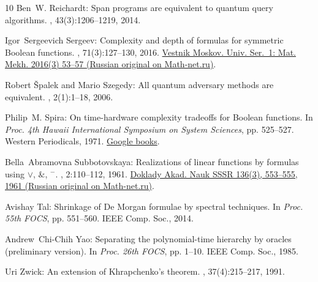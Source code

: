 \begin{thebibliography}{10}
{\sc Ben~W. Reichardt}: Span programs are equivalent to quantum query
  algorithms.
, 43(3):1206--1219, 2014.
\newblock [\epfmtdoi{10.1137/100792640}]

{\sc Igor~Sergeevich Sergeev}: Complexity and depth of formulas for symmetric
  {B}oolean functions.
, 71(3):127--130, 2016.
\newblock \href{https://mi.mathnet.ru/vmumm155}{Vestnik Moskov. Univ. Ser.~1:
  Mat. Mekh. 2016(3) 53--57 (Russian original on Math-net.ru)}.
\newblock [\epfmtdoi{10.3103/S0027132216030098}]

{\sc Robert {\v{S}}palek and Mario Szegedy}: All quantum adversary methods are
  equivalent.
, 2(1):1--18, 2006.

{\sc Philip~M. Spira}: On time-hardware complexity tradeoffs for {B}oolean
  functions.
\newblock In {\em Proc. 4th Hawaii International Symposium on System Sciences},
  pp. 525--527. Western Periodicals, 1971.
\newblock
  \href{https://books.google.com/books/about/Proceedings_Fourth_Hawaii_International.html?id=Y0zVjwEACAAJ}{Google
  books}.

{\sc Bella~Abramovna Subbotovskaya}: Realizations of linear functions by
  formulas using $\vee$, $\&$, $^-$.
, 2:110--112, 1961.
\newblock \href{https://mi.mathnet.ru/dan24539}{Doklady Akad. Nauk SSSR 136(3),
  553--555, 1961 (Russian original on Math-net.ru)}.

{\sc Avishay Tal}: Shrinkage of {D}e {M}organ formulae by spectral techniques.
\newblock In {\em Proc. 55th FOCS}, pp. 551--560. IEEE Comp. Soc., 2014.

{\sc Andrew~Chi{-}Chih Yao}: Separating the polynomial-time hierarchy by
  oracles (preliminary version).
\newblock In {\em Proc. 26th FOCS}, pp. 1--10. IEEE Comp. Soc., 1985.

{\sc Uri Zwick}: An extension of {Khrapchenko}'s theorem.
, 37(4):215--217, 1991.
\newblock [\epfmtdoi{10.1016/0020-0190(91)90191-J}]

\end{thebibliography}